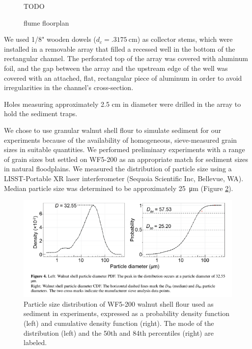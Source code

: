 \documentclass{scrreprt}
\begin{document}
\begin{figure}[htbp]
TODO
\centering
\caption{flume floorplan}
\label{fig:floorplan}
\end{figure}

We used 1/8" wooden dowels ($d_c = \SI{.3175}{\centi\metre}$) as collector stems, which were installed in a removable array that filled a recessed well in the bottom of the rectangular channel. The perforated top of the array was covered with aluminum foil, and the gap between the array and the upstream edge of the well was covered with an attached, flat, rectangular piece of aluminum in order to avoid irregularities in the channel's cross-section. 

Holes measuring approximately 2.5 cm in diameter were drilled in the array to hold the sediment traps. %

We chose to use granular walnut shell flour to simulate sediment for our experiments because of the availability of homogeneous, sieve-measured grain sizes in suitable quantities. We performed preliminary experiments with a range of grain sizes but settled on WF5-200 as an appropriate match for sediment sizes in natural floodplains. We measured the distribution of particle size using a LISST-Portable XR laser interferometer (Sequoia Scientific Inc, Bellevue, WA). Median particle size was determined to be approximately \SI{25}{\micro\metre} (Figure \ref{fig:sedsize}).

\begin{figure}[htbp]
\includegraphics[width=15cm,trim = {0 3cm 0 0},clip]{wf5-200sizedist.png}
\centering
\caption{Particle size distribution of WF5-200 walnut shell flour used as sediment in experiments, expressed as a probability density function (left) and cumulative density function (right). The mode of the distribution (left) and the 50th and 84th percentiles (right) are labeled.} %
\label{fig:sedsize}
\end{figure}
\end{document}
